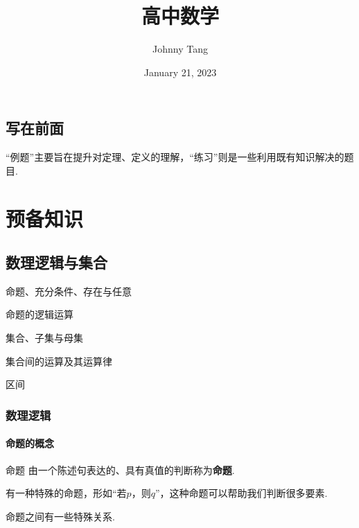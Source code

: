 \documentclass[lang=cn, zihao=5]{elegantbook}
\title{高中数学}
\author{Johnny Tang}
\institute{DEEP Team}
\date{January 21, 2023}
\begin{document}
\maketitle

\frontmatter

\mainmatter

\chapter*{写在前面}

“例题”主要旨在提升对定理、定义的理解，“练习”则是一些利用既有知识解决的题目.

\tableofcontents

\newpage

\part{预备知识}

\setcounter{chapter}{-1}
\chapter{数理逻辑与集合}

\begin{introduction}
	\item 命题、充分条件、存在与任意
	\item 命题的逻辑运算
	\item 集合、子集与母集
	\item 集合间的运算及其运算律
	\item 区间
\end{introduction}

\section{数理逻辑}

\subsection{命题的概念}

\begin{definition}{命题}
	由一个陈述句表达的、具有真值的判断称为\textbf{命题}.
\end{definition}
\begin{remark}
	有一种特殊的命题，形如“若$p$，则$q$”，这种命题可以帮助我们判断很多要素.
\end{remark}

命题之间有一些特殊关系.
\end{document}
